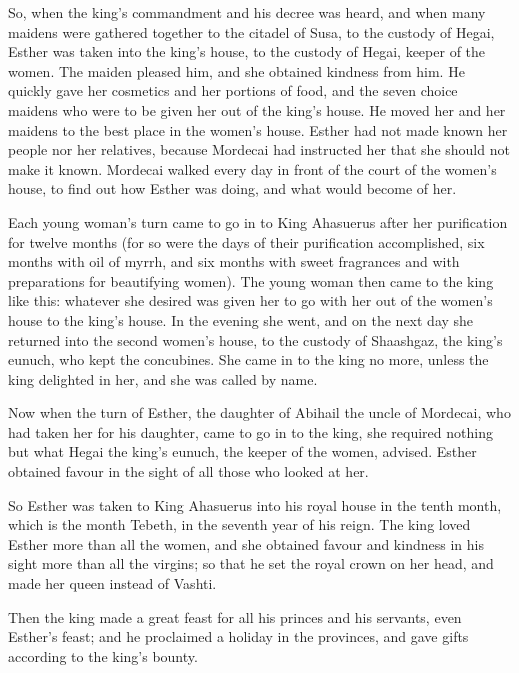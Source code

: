  So, when the king's commandment and his decree was heard,
and when many maidens were gathered together to the citadel of Susa, to
the custody of Hegai, Esther was taken into the king's house, to the
custody of Hegai, keeper of the women.  The maiden pleased
him, and she obtained kindness from him. He quickly gave her cosmetics
and her portions of food, and the seven choice maidens who were to be
given her out of the king's house. He moved her and her maidens to the
best place in the women's house.  Esther had not made
known her people nor her relatives, because Mordecai had instructed her
that she should not make it known.  Mordecai walked every
day in front of the court of the women's house, to find out how Esther
was doing, and what would become of her.

 Each young woman's turn came to go in to King Ahasuerus
after her purification for twelve months (for so were the days of their
purification accomplished, six months with oil of myrrh, and six months
with sweet fragrances and with preparations for beautifying women).
 The young woman then came to the king like this:
whatever she desired was given her to go with her out of the women's
house to the king's house.  In the evening she went, and
on the next day she returned into the second women's house, to the
custody of Shaashgaz, the king's eunuch, who kept the concubines. She
came in to the king no more, unless the king delighted in her, and she
was called by name.

 Now when the turn of Esther, the daughter of Abihail the
uncle of Mordecai, who had taken her for his daughter, came to go in to
the king, she required nothing but what Hegai the king's eunuch, the
keeper of the women, advised. Esther obtained favour in the sight of all
those who looked at her.

 So Esther was taken to King Ahasuerus into his royal
house in the tenth month, which is the month Tebeth, in the seventh year
of his reign.  The king loved Esther more than all the
women, and she obtained favour and kindness in his sight more than all
the virgins; so that he set the royal crown on her head, and made her
queen instead of Vashti.

 Then the king made a great feast for all his princes and
his servants, even Esther's feast; and he proclaimed a holiday in the
provinces, and gave gifts according to the king's bounty.


